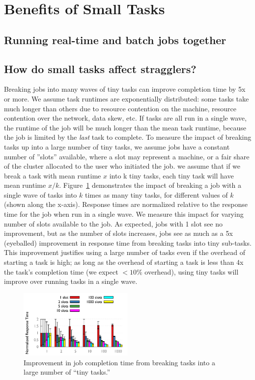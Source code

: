 \section{Benefits of Small Tasks}
\subsection{Running real-time and batch jobs together}
\subsection{How do small tasks affect stragglers?}
Breaking jobs into many waves of tiny tasks can improve completion time by 5x or more.  We assume task runtimes are exponentially distributed: some tasks take much longer than others due to resource contention on the machine, resource contention over the network, data skew, etc.  If tasks are all run in a single wave, the runtime of the job will be much longer than the mean task runtime, because the job is limited by the \emph{last} task to complete.  To measure the impact of breaking tasks up into a large number of tiny tasks, we assume jobs have a constant number of ''slots'' available, where a slot may represent a machine, or a fair share of the cluster allocated to the user who initiated the job.  we assume that if we break a task with mean runtime $x$ into k tiny tasks, each tiny task will have mean runtime $x/k$.  Figure~\ref{fig:outliers} demonstrates the impact of breaking a job with a single wave of tasks into $k$ times as many tiny tasks, for different values of $k$ (shown along the x-axis).  Response times are normalized relative to the response time for the job when run in a single wave.  We measure this impact for varying number of slots available to the job.  As expected, jobs with 1 slot see no improvement, but as the number of slots increases, jobs see as much as a 5x (eyeballed) improvement in response time from breaking tasks into tiny sub-tasks. This improvement justifies using a large number of tasks even if the overhead of starting a task is high; as long as the overhead of starting a task is less than 4x the task's completion time (we expect $<10$\% overhead), using tiny tasks will improve over running tasks in a single wave.

\begin{figure}[t]
\centering
\vspace{-10ex}
\includegraphics[width=0.5\textwidth]{figures/results_stragglers}
\vspace{-4ex}
\caption{Improvement in job completion time from breaking tasks into a large number of ``tiny tasks.'' }
\vspace{-2ex}
\label{fig:outliers}
\end{figure}

